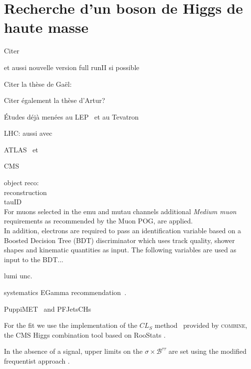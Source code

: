 \chapter{Recherche d'un boson de Higgs de haute masse}\label{chapter-HTT_analysis}

Citer 

et aussi nouvelle version full runII si possible


Citer la thèse de Gaël:\\

Citer également la thèse d'Artur?\\


Études déjà menées au LEP~\cite{Schael:2006cr} et au Tevatron~\cite{Aaltonen:2009vf,Abazov:2011jh}

LHC: aussi avec \quarkb\antiquarkb~\cite{Chatrchyan:2013qga,Khachatryan:2015tra}

ATLAS \mu\mu\ et \tau\tau~\cite{Aad:2012cfr,ATLAS-MSSM-HTT_2018}

CMS \mu\mu~\cite{CMS:2015ooa} \tau\tau~\cite{Chatrchyan:2012vp,CMS-MSSM-HTT_2014,CMS-PAS-HIG-17-020}

object reco:\\
reconstruction \tauh~\cite{Khachatryan:2015dfa,Sirunyan:2018pgf}\\
tauID \cite{TauPOG,CMS-DP-2019-033}\\
For muons selected in the emu and mutau channels additional \textit{Medium muon} requirements as recommended by the Muon POG, are applied.\cite{cmsMediumMuon}\\
In addition, electrons are required to pass an identification variable based on a Boosted Decision Tree (BDT) discriminator which uses track quality, shower shapes and kinematic quantities as input. The following variables are used as input to the BDT... \cite{cmsElectronMVA}


lumi unc.~\cite{LumiTwiki}

systematics EGamma recommendation~\cite{EGammaRunII}.

PuppiMET~\cite{PUPPI} and PFJetsCHs

For the fit we use the implementation of the $CL_S$ method~\cite{CLs_method} provided by \textsc{combine}, the CMS Higgs combination tool based on RooStats \cite{RooStats}.

In the absence of a signal, upper limits on the $\sigma\times\mathcal{B}^{\tau\tau}$ are set using the modified frequentist approach \citep{Junk:1999kv,Read_2002}.

